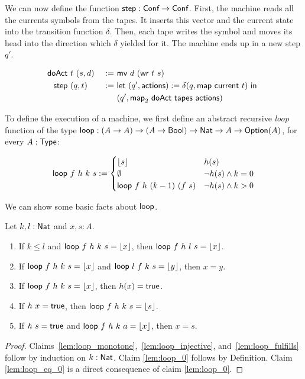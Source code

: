 We can now define the function $\textsf{step} : \textsf{Conf} \rightarrow \textsf{Conf}$.  First, the machine reads all the currents symbols from the tapes.  It inserts this
vector and the current state into the transition function $\delta$.  Then, each tape writes the symbol and moves its head into the direction which
$\delta$ yielded for it.  The machine ends up in a new step $q'$.

\begin{definition}[$\MS{step}$]
  \label{def:step}
  \begin{alignat*}{2}
    \textsf{doAct} &~t~(s, d) &~:=~& \textsf{mv}~d~(\textsf{wr}~t~s) \\
    \textsf{step}  &~(q, t)   &~:=~& \textsf{let}~(q', \textsf{actions}) := \delta(q, \textsf{map}~\textsf{current}~t)~\textsf{in}~ \\
               &          &~  ~& (q', \textsf{map}_2~\textsf{doAct}~\textsf{tapes}~\textsf{actions})
  \end{alignat*}
\end{definition}

To define the execution of a machine, we first define an abstract recursive \emph{loop} function of the type
$\textsf{loop} : (A \rightarrow A) \rightarrow (A \rightarrow \textsf{Bool}) \rightarrow \textsf{Nat} \rightarrow A \rightarrow \textsf{Option}(A)$, for every $A:\textsf{Type}$:

\begin{definition}[$\Loop$]
  \begin{align*}
    \textsf{loop}~f~h~k~s :=
    \begin{cases}
      \left\lfloor {s} \right\rfloor                   & h(s) \\
      \emptyset                      & \lnot h(s) \land k = 0 \\
      \textsf{loop}~f~h~(k-1)~(f~s)  & \lnot h(s) \land k > 0
    \end{cases}
  \end{align*}
\end{definition}

We can show some basic facts about $\Loop$.
\begin{lemma}
  \label{lem:loop}
  Let $k,l : \textsf{Nat}$ and $x,s:A$.
  \begin{enumerate}
  \item \label{lem:loop_monotone}
    If $k \le l$ and $\textsf{loop}~f~h~k~s = \left\lfloor {x} \right\rfloor$, then $\textsf{loop}~f~h~l~s = \left\lfloor {x} \right\rfloor$.
  \item \label{lem:loop_injective}
    If $\textsf{loop}~f~h~k~s = \left\lfloor {x} \right\rfloor$ and $\textsf{loop}~l~f~k~s = \left\lfloor {y} \right\rfloor$, then $x = y$.
  \item \label{lem:loop_fulfills}
    If $\textsf{loop}~f~h~k~s = \left\lfloor {x} \right\rfloor$, then $h(x) = \textsf{true}$.
  \item \label{lem:loop_0}
    If $h~x = \textsf{true}$, then $\textsf{loop}~f~h~k~s = \left\lfloor {s} \right\rfloor$.
  \item \label{lem:loop_eq_0}
    If $h~s = \textsf{true}$ and $\textsf{loop}~f~h~k~a = \left\lfloor {x} \right\rfloor$, then $x=s$.
  \end{enumerate}
\end{lemma}
\begin{proof}
  Claims~\ref{lem:loop_monotone},~\ref{lem:loop_injective}, and~\ref{lem:loop_fulfills} follow by induction on $k : \textsf{Nat}$.  Claim \ref{lem:loop_0}
  follows by Definition.  Claim \ref{lem:loop_eq_0} is a direct consequence of claim \ref{lem:loop_0}.
\end{proof}


